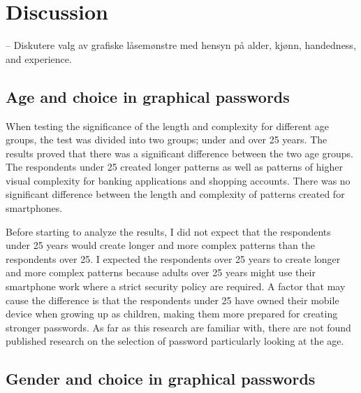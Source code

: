 \chapter{Discussion}\label{chap:discussion}

  -- Diskutere valg av grafiske låsemønstre med hensyn på alder, kjønn, handedness, and experience. 

  \clearpage


  
  \clearpage
  \section{Age and choice in graphical passwords}

    When testing the significance of the length and complexity for different age groups, the test was divided into two groups; under and over 25 years. The results proved that there was a significant difference between the two age groups. The respondents under 25 created longer patterns as well as patterns of higher visual complexity for banking applications and shopping accounts. There was no significant difference between the length and complexity of patterns created for smartphones. 

    Before starting to analyze the results, I did not expect that the respondents under 25 years would create longer and more complex patterns than the respondents over 25. I expected the respondents over 25 years to create longer and more complex patterns because adults over 25 years might use their smartphone work where a strict security policy are required. A factor that may cause the difference is that the respondents under 25 have owned their mobile device when growing up as children, making them more prepared for creating stronger passwords. As far as this research are familiar with, there are not found published research on the selection of password particularly looking at the age.  

  \section{Gender and choice in graphical passwords}


